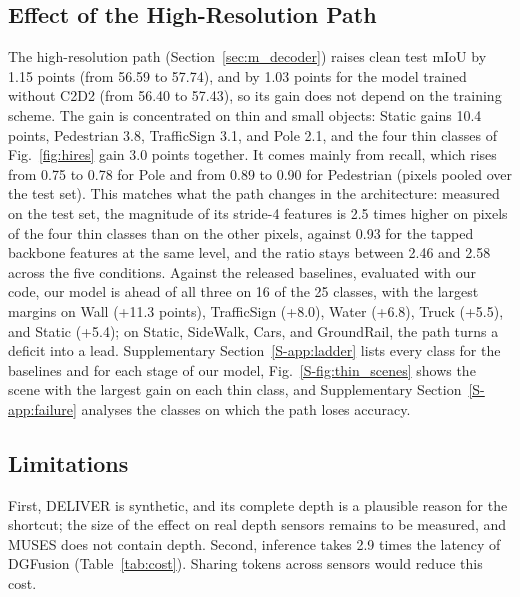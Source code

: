 \subsection{Effect of the High-Resolution Path}
The high-resolution path (Section~\ref{sec:m_decoder}) raises clean test mIoU by 1.15 points (from 56.59 to 57.74), and by 1.03 points for the model trained without C2D2 (from 56.40 to 57.43), so its gain does not depend on the training scheme. The gain is concentrated on thin and small objects: Static gains 10.4 points, Pedestrian 3.8, TrafficSign 3.1, and Pole 2.1, and the four thin classes of Fig.~\ref{fig:hires} gain 3.0 points together. It comes mainly from recall, which rises from 0.75 to 0.78 for Pole and from 0.89 to 0.90 for Pedestrian (pixels pooled over the test set). This matches what the path changes in the architecture: measured on the test set, the magnitude of its stride-4 features is 2.5 times higher on pixels of the four thin classes than on the other pixels, against 0.93 for the tapped backbone features at the same level, and the ratio stays between 2.46 and 2.58 across the five conditions. Against the released baselines, evaluated with our code, our model is ahead of all three on 16 of the 25 classes, with the largest margins on Wall (+11.3 points), TrafficSign (+8.0), Water (+6.8), Truck (+5.5), and Static (+5.4); on Static, SideWalk, Cars, and GroundRail, the path turns a deficit into a lead. Supplementary Section~\ref{S-app:ladder} lists every class for the baselines and for each stage of our model, Fig.~\ref{S-fig:thin_scenes} shows the scene with the largest gain on each thin class, and Supplementary Section~\ref{S-app:failure} analyses the classes on which the path loses accuracy.




\subsection{Limitations}
First, DELIVER is synthetic, and its complete depth is a plausible reason for the shortcut; the size of the effect on real depth sensors remains to be measured, and MUSES does not contain depth. Second, inference takes 2.9 times the latency of DGFusion (Table~\ref{tab:cost}). Sharing tokens across sensors would reduce this cost.
